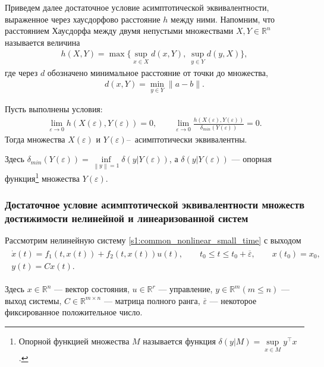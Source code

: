 \documentclass[../main.tex]{subfiles}
\begin{document}
Приведем далее достаточное условие асимптотической эквивалентности, выраженное через хаусдорфово расстояние $ h $ между ними. 
Напомним, что расстоянием Хаусдорфа между двумя непустыми множествами $X, Y \in \mathbb{R}^n$ называется величина 
\begin{gather*}
	h(X,Y) = \max\Big\{ \sup\limits_{x \in X} d(x, Y), \ \sup\limits_{y \in Y} d(y, X) \Big\},
\end{gather*}
где через $d$ обозначено минимальное расстояние от точки до множества, 
\begin{gather*}
	d(x, Y) = \min\limits_{y \in Y} \| a - b\|.
\end{gather*} 
\begin{theorem}\label{suff}\cite{GusevUMJ}
 Пусть выполнены условия:
 \begin{gather*}
 \lim\limits_{\varepsilon \rightarrow 0}h(X(\varepsilon),Y(\varepsilon)) = 0, \qquad \lim\limits_{\varepsilon \rightarrow 0}\frac{h(X(\varepsilon),Y(\varepsilon))}{\delta_{min}(Y(\varepsilon))} = 0.
 \end{gather*}
 Тогда множества $ X(\varepsilon) $ и $ Y(\varepsilon) $\---~асимптотически эквивалентны. 
\end{theorem}
 Здесь $ \delta_{min}(Y(\varepsilon)) = \inf\limits_{\left\|y \right\| =1 } \delta(y|Y(\varepsilon))$, а $ \delta(y|Y(\varepsilon)) $ --- опорная функция\footnote{
	Опорной функцией множества $M$ называется функция $\delta(y|M) = \sup\limits_{x \in M} y^{\top} x$. 
} множества $ Y(\varepsilon) $.
\subsubsection{Достаточное условие асимптотической эквивалентности множеств достижимости нелинейной и линеаризованной систем}
 Рассмотрим нелинейную систему \eqref{s1:common_nonlinear_small_time} с выходом
\begin{gather}\label{s2:nonlinear_with_output}
 \begin{gathered}
 \dot{x}(t)=f_1(t,x(t))+f_2(t,x(t))u(t), \qquad t_0 \leqslant t \leqslant t_0 + \overline{\varepsilon}, \qquad x(t_0) = x_0, \\
 y(t) = C x(t).
 \end{gathered}
\end{gather}

Здесь $ x \in \mathbb{R}^n $ --- вектор состояния, $ u \in \mathbb{R}^r $ --- управление, $ y\in\mathbb{R}^m (m \leqslant n) $ --- выход системы,
$ C\in \mathbb{R}^{m \times n} $ --- матрица полного ранга, $ \overline{\varepsilon} $ --- некоторое фиксированное положительное число.
\end{document}
